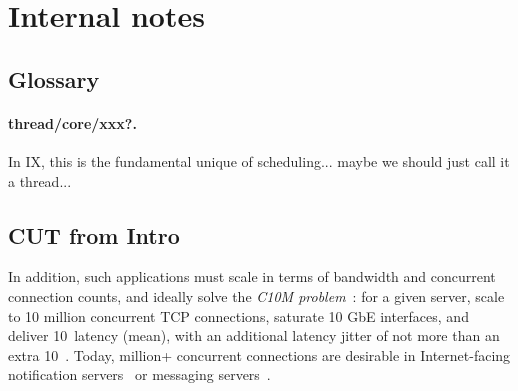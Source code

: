 

\section{Internal notes}


\subsection{Glossary}

\paragraph{thread/core/xxx?.}  In IX, this is the fundamental unique of scheduling... maybe we should just call it a thread...



\subsection{ CUT from Intro}



In addition, such applications must scale in terms of bandwidth and
concurrent connection counts, and ideally solve the \emph{C10M
  problem}~\cite{theC10Mproblem}: for a given server, scale to 10
million concurrent TCP connections, saturate 10 GbE interfaces, and
deliver 10~\microsecond latency (mean), with an additional latency
jitter of not more than an extra 10~\microsecond.  Today, million+
concurrent connections are desirable in Internet-facing notification
servers~\cite{DBLP:conf/sosp/AdyaCMP11} or messaging
servers~\cite{whatsapp-2mil}. 



